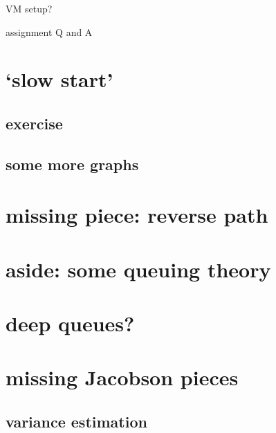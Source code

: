 \begin{frame}{VM setup?}
\end{frame}

\begin{frame}{assignment Q and A}
\end{frame}

\section{`slow start'}




\subsection{exercise}


\subsection{some more graphs}


\section{missing piece: reverse path}


\section{aside: some queuing theory}


\section{deep queues?}


\section{missing Jacobson pieces}

\subsection{variance estimation}


